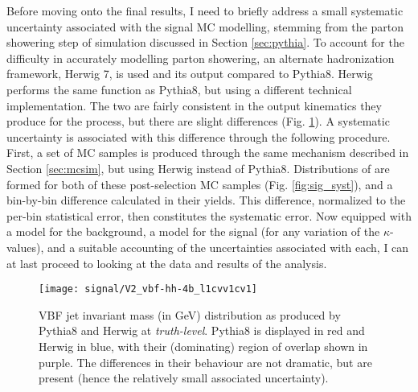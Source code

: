     Before moving onto the final results, I need to briefly address a small systematic uncertainty associated with the signal MC modelling,
        stemming from the parton showering step of simulation discussed in Section \ref{sec:pythia}.
    To account for the difficulty in accurately modelling parton showering, 
        an alternate hadronization framework, Herwig 7\cite{Bellm:2015jjp},
        is used and its output compared to Pythia8.
    Herwig performs the same function as Pythia8, but using a different technical implementation.
    The two are fairly consistent in the output kinematics they produce for the \vbfhhproc process,
        but there are slight differences (Fig. \ref{fig:pyth_herwig_mjj}).
    A systematic uncertainty is associated with this difference through the following procedure.
    First, a set of MC samples is produced through the same mechanism described in Section \ref{sec:mcsim},
        but using Herwig instead of Pythia8.
    Distributions of \mhh are formed for both of these post-selection MC samples (Fig. \ref{fig:sig_syst}),
        and a bin-by-bin difference calculated in their yields.
    This difference, normalized to the per-bin statistical error, then constitutes the systematic error.
    Now equipped with a model for the background, a model for the signal
        (for any variation of the $\kappa$-values),
        and a suitable accounting of the uncertainties associated with each,
        I can at last proceed to looking at the data and results of the analysis.

    \begin{figure}[tbh] \centering
        \texttt{[image: signal/V2\_vbf-hh-4b\_l1cvv1cv1]}
        \caption{
            VBF jet invariant mass (in GeV) distribution as produced by Pythia8 and Herwig at \textit{truth-level}.
            Pythia8 is displayed in red and Herwig in blue, with their (dominating) region of overlap shown in purple.
            The differences in their behaviour are not dramatic, but are present
                (hence the relatively small associated uncertainty).
        }
        \label{fig:pyth_herwig_mjj}
    \end{figure}

